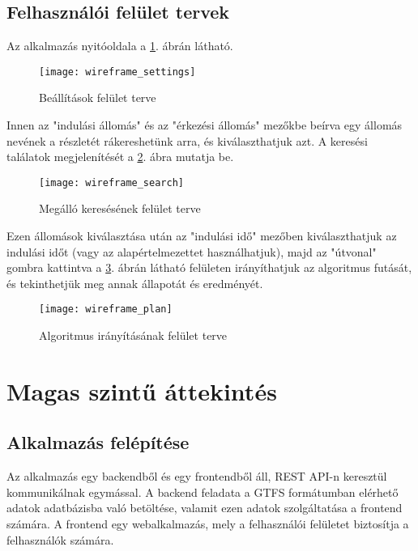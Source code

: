 \subsection{Felhasználói felület tervek}

Az alkalmazás nyitóoldala a \ref{fig:wireframe-settings}. ábrán látható.

\begin{figure}[H]
    \centering
    \texttt{[image: wireframe\_settings]}
    \caption{Beállítások felület terve}
    \label{fig:wireframe-settings}
\end{figure}

Innen az "indulási állomás" és az "érkezési állomás" mezőkbe beírva egy állomás nevének a részletét rákereshetünk arra, és kiválaszthatjuk azt. A keresési találatok megjelenítését a \ref{fig:wireframe-search}. ábra mutatja be.

\begin{figure}[H]
    \centering
    \texttt{[image: wireframe\_search]}
    \caption{Megálló keresésének felület terve}
    \label{fig:wireframe-search}
\end{figure}

Ezen állomások kiválasztása után az "indulási idő" mezőben kiválaszthatjuk az indulási időt (vagy az alapértelmezettet használhatjuk), majd az "útvonal" gombra kattintva a \ref{fig:wireframe-plan}. ábrán látható felületen irányíthatjuk az algoritmus futását, és tekinthetjük meg annak állapotát és eredményét.

\begin{figure}[H]
    \centering
    \texttt{[image: wireframe\_plan]}
    \caption{Algoritmus irányításának felület terve}
    \label{fig:wireframe-plan}
\end{figure}

\section{Magas szintű áttekintés}

\subsection{Alkalmazás felépítése}

Az alkalmazás egy backendből és egy frontendből áll, REST API-n keresztül kommunikálnak egymással. A backend feladata a GTFS formátumban elérhető adatok adatbázisba való betöltése, valamit ezen adatok szolgáltatása a frontend számára. A frontend egy webalkalmazás, mely a felhasználói felületet biztosítja a felhasználók számára.

